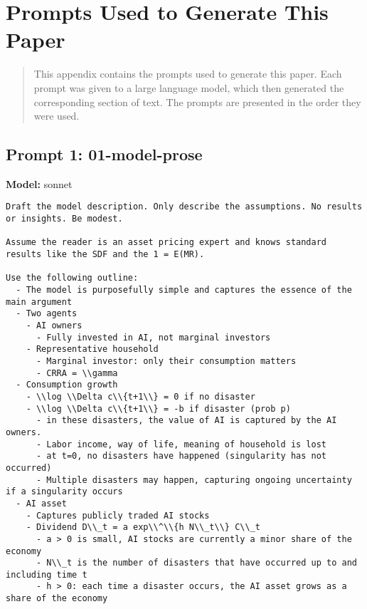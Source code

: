 \appendix
\section{Prompts Used to Generate This Paper}
\begin{quote}
This appendix contains the prompts used to generate this paper. Each prompt was given to a large language model, which then generated the corresponding section of text. The prompts are presented in the order they were used.
\end{quote}
\vspace{2em}
\subsection*{Prompt 1: 01-model-prose}
\textbf{Model:} sonnet
\vspace{0.5em}
\begin{lstlisting}[language=text,breaklines=true,frame=single]
Draft the model description. Only describe the assumptions. No results or insights. Be modest. 

Assume the reader is an asset pricing expert and knows standard results like the SDF and the 1 = E(MR). 

Use the following outline:
  - The model is purposefully simple and captures the essence of the main argument
  - Two agents
    - AI owners
      - Fully invested in AI, not marginal investors
    - Representative household
      - Marginal investor: only their consumption matters
      - CRRA = \\gamma
  - Consumption growth
    - \\log \\Delta c\\{t+1\\} = 0 if no disaster
    - \\log \\Delta c\\{t+1\\} = -b if disaster (prob p)
      - in these disasters, the value of AI is captured by the AI owners. 
      - Labor income, way of life, meaning of household is lost 
      - at t=0, no disasters have happened (singularity has not occurred)
      - Multiple disasters may happen, capturing ongoing uncertainty if a singularity occurs
  - AI asset
    - Captures publicly traded AI stocks
    - Dividend D\\_t = a exp\\^\\{h N\\_t\\} C\\_t
      - a > 0 is small, AI stocks are currently a minor share of the economy
      - N\\_t is the number of disasters that have occurred up to and including time t
      - h > 0: each time a disaster occurs, the AI asset grows as a share of the economy

\end{lstlisting}
\vspace{1em}
